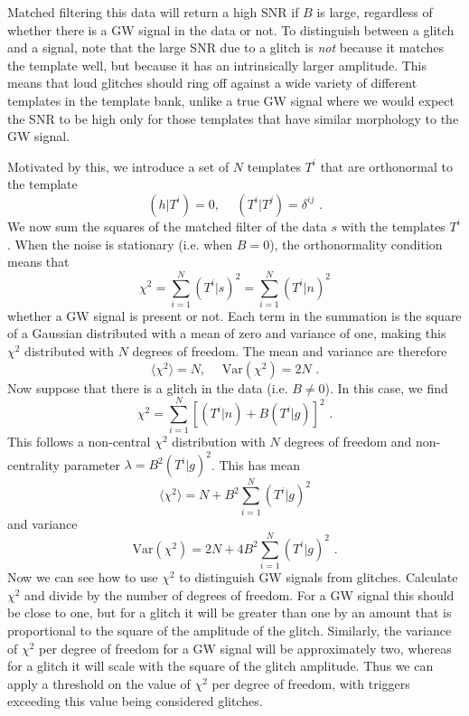 \documentclass[11pt]{cuthesis}
\newcommand{\fs}{\text{ .}}
\begin{document}
Matched filtering this data will return a high SNR if $B$ is large, regardless of whether there is a GW signal in the data or not.  To distinguish between a glitch and a signal, note that the large SNR due to a glitch is \textit{not} because it matches the template well, but because it has an intrinsically larger amplitude. This means that loud glitches should ring off against a wide variety of different templates in the template bank, unlike a true GW signal where we would expect the SNR to be high only for those templates that have similar morphology to the GW signal. 

Motivated by this, we introduce a set of $N$ templates $T^i$ that are orthonormal to the template
\begin{equation}
(h|T^i) = 0, \hspace{15pt} (T^i|T^j) = \delta^{ij} \fs
\end{equation}
We now sum the squares of the matched filter of the data $s$ with the templates $T^i$. When the noise is stationary (i.e. when $B=0$), the orthonormality condition means that 
\begin{equation}
\chi^2 = \sum_{i=1}^N(T^i|s)^2 = \sum_{i=1}^N(T^i|n)^2
\end{equation} 
whether a GW signal is present or not. Each term in the summation is the square of a Gaussian distributed with a mean of zero and variance of one, making this $\chi^2$ distributed with $N$ degrees of freedom. The mean and variance are therefore
\begin{equation}
\langle \chi^2 \rangle = N, \hspace{15pt} \text{Var}(\chi^2) = 2N \fs
\end{equation}
Now suppose that there is a glitch in the data (i.e. $B \neq 0$). In this case, we find
\begin{equation}
\chi^2 = \sum_{i=1}^N [ (T^i|n) + B(T^i|g)]^2 \fs
\end{equation}
This follows a non-central $\chi^2$ distribution with $N$ degrees of freedom and non-centrality parameter $\lambda = B^2(T^i|g)^2$.
This has mean
\begin{equation}
\langle \chi^2 \rangle = N + B^2 \sum_{i=1}^N (T^i|g)^2
\end{equation}
and variance
\begin{equation}
\text{Var}(\chi^2) = 2N + 4B^2 \sum_{i=1}^N (T^i|g)^2\fs
\end{equation}
Now we can see how to use $\chi^2$ to distinguish GW signals from glitches. Calculate $\chi^2$ and divide by the number of degrees of freedom. For a GW signal this should be close to one, but for a glitch it will be greater than one by an amount that is proportional to the square of the amplitude of the glitch. Similarly, the variance of $\chi^2$ per degree of freedom for a GW signal will be approximately two, whereas for a glitch it will scale with the square of the glitch amplitude. Thus we can apply a threshold on the value of $\chi^2$ per degree of freedom, with triggers exceeding this value being considered glitches. 
\end{document}
